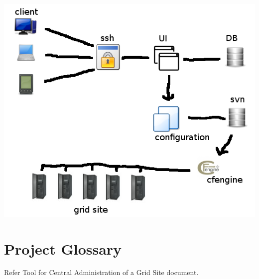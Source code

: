 \documentclass[12pt]{article}
\begin{document}
\includegraphics[width=\linewidth]{arch.png}

\section{Project Glossary}

Refer Tool for Central Administration of a Grid Site document.
\end{document}
